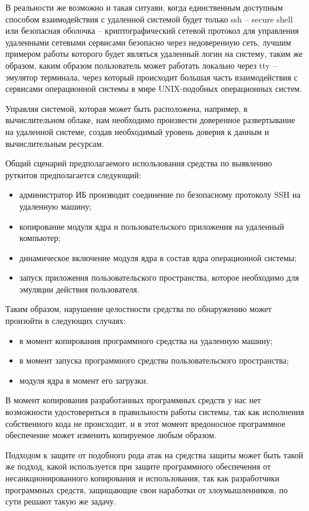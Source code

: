 \documentclass{gost7.32-2001}
\begin{document}
В реальности же возможно и такая ситуаяи, когда единственным доступным
способом взаимодействия с удаленной системой будет только ssh – secure
shell или безопасная оболочка – криптографический сетевой протокол для
управления удаленными сетевыми сервисами безопасно через недоверенную
сеть, лучшим примером работы которого будет являться удаленный логин
на систему, таким же образом, каким образом пользователь может
работать локально через tty – эмулятор терминала, через который
происходит большая часть взаимодействия с сервисами операционной
системы в мире UNIX-подобных операционных систем.

Управляя системой, которая может быть расположена, например, в
вычислительном облаке, нам необходимо произвести доверенное
развертывание на удаленной системе, создав необходимый уровень доверия
к данным и вычислительным ресурсам.

Общий сценарий предполагаемого использования средства по выявлению
руткитов предполагается следующий:
\begin{itemize}
\item
  администратор ИБ производит соединение по безопасному протоколу SSH
  на удаленную машину;
\item
  копирование модуля ядра и пользовательского приложения на удаленный
  компьютер;
\item
  динамическое включение модуля ядра в состав ядра операционной
  системы;
\item
  запуск приложения пользовательского пространства, которое необходимо
  для эмуляции действия пользователя.
\end{itemize}

\newpage
Таким образом, нарушение целостности средства по обнаружению может
произойти в следующих случаях:
\begin{itemize}
\item
  в момент копирования программного средства на удаленную машину;
\item
  в момент запуска программного средства пользовательского
  пространства;
\item
  модуля ядра в момент его загрузки.
\end{itemize}

В момент копирования разработанных программных средств у нас нет
возможности удостовериться в правильности работы системы, так как
исполнения собственного кода не происходит, и в этот момент
вредоносное программное обеспечение может изменить копируемое любым
образом.

Подходом к защите от подобного рода атак на средства защиты может быть
такой же подход, какой используется при защите программного
обеспечения от несанкционированного копирования и использования, так
как разработчики программных средств, защищающие свои наработки от
злоумышленников, по сути решают такую же задачу.
\end{document}

